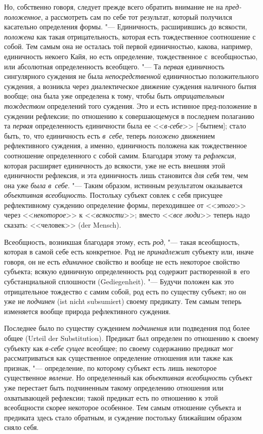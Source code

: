 Но, собственно говоря, следует прежде всего обратить внимание не на
{\em пред-положенное}, а рассмотреть сам по себе тот результат, который
получился касательно определения формы. "--- Единичность, расширившись до
всякости, {\em положена} как такая отрицательность, которая есть тождественное
соотношение с собой. Тем самым она не осталась той первой единичностью, какова,
например, единичность некоего Кайя, но есть определение, тождественное
с~всеобщностью, или абсолютная определенность всеобщего. "--- Та {\em первая}
единичность сингулярного суждения не была {\em непосредственной} единичностью
положительного суждения, а возникла через диалектическое движение суждения
наличного бытия вообще; она была уже определена к тому, чтобы быть
{\em отрицательным тождеством} определений того суждения. Это и есть истинное
пред-положение в суждении рефлексии; по отношению к совершающемуся в последнем
полаганию та {\em первая} определенность единичности была ее <<{\em в-себе}>>
[-бытием]; стало быть, то, что единичность есть {\em в~себе}, теперь
{\em положено} движением рефлективного суждения, а именно, единичность положена
как тождественное соотношение определенного с собой самим. Благодаря этому та
{\em рефлексия}, которая расширяет единичность до всякости, уже не есть внешняя
этой единичности рефлексия, и эта единичность лишь становится {\em для себя}
тем, чем она уже {\em была в~себе}. "--- Таким образом, истинным результатом
оказывается {\em объективная всеобщность}. Постольку субъект совлек с себя
присущее рефлективному суждению определение формы, переходившее от
<<{\em этого}>> через <<{\em некоторое}>> к <<{\em всякости}>>; вместо
<<{\em все люди}>> теперь надо сказать: <<человек>> (der Mensch).

Всеобщность, возникшая благодаря этому, есть {\em род}, "--- такая всеобщность,
которая в самой себе есть конкретное. Род не {\em принадлежит} субъекту или,
иначе говоря, он не есть {\em единичное} свойство и вообще не есть некоторое
свойство субъекта; всякую единичную определенность род содержит растворенной
в~его субстанциальной сплошности (Gedie\-genheit). "--- Будучи положен как это
отрицательное тождество с самим собой, род есть по существу субъект; но он уже
не {\em подчинен} (ist nicht subsumiert) своему предикату. Тем самым теперь
изменяется вообще природа рефлективного суждения.

Последнее было по существу суждением {\em подчинения} или подведения под более
общее (Urteil der Substi\-tution). Предикат был определен по отношению к
своему субъекту как {\em в-себе сущее} всеобщее; по своему содержанию предикат
мог рассматриваться как существенное определение отношения или также как
признак, "--- определение, по которому субъект есть лишь некоторое существенное
{\em явление}. Но определенный как {\em объективная всеобщность} субъект уже
перестает быть подчиненным такому определению отношения или охватывающей
рефлексии; такой предикат есть по отношению к этой всеобщности скорее некоторое
особенное. Тем самым отношение субъекта и предиката здесь стало обратным, и
суждение постольку ближайшим образом сняло себя.

